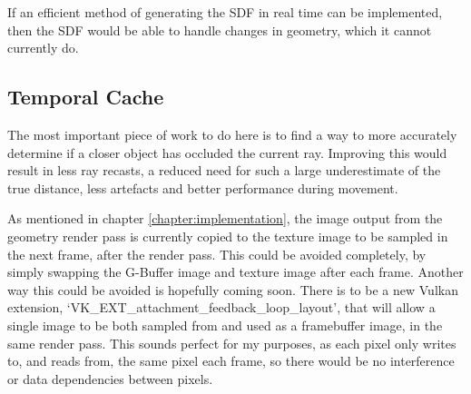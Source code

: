 If an efficient method of generating the SDF in real time can be implemented, then the SDF would be able to handle changes in geometry, which it cannot currently do.

\subsection{Temporal Cache}

The most important piece of work to do here is to find a way to more accurately determine if a closer object has occluded the current ray. Improving this would result in less ray recasts, a reduced need for such a large underestimate of the true distance, less artefacts and better performance during movement.\newline

As mentioned in chapter \ref{chapter:implementation}, the image output from the geometry render pass is currently copied to the texture image to be sampled in the next frame, after the render pass. This could be avoided completely, by simply swapping the G-Buffer image and texture image after each frame. Another way this could be avoided is hopefully coming soon. There is to be a new Vulkan extension, `VK\_EXT\_attachment\_feedback\_loop\_layout', that will allow a single image to be both sampled from and used as a framebuffer image, in the same render pass. This sounds perfect for my purposes, as each pixel only writes to, and reads from, the same pixel each frame, so there would be no interference or data dependencies between pixels.